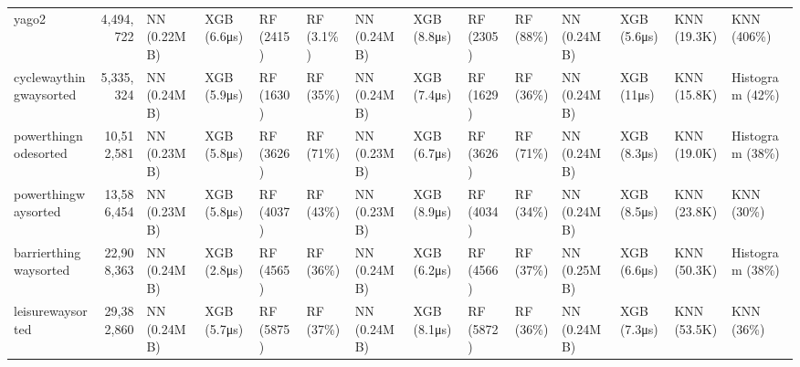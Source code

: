 \documentclass{article}
\begin{document}
\begin{table}
{\begin{tabular}{l|r|l|l|l|l|l|l|l|l|l|l|l|l}
yago2 & 4,494,722 & NN (0.22MB) & XGB (6.6μs) & RF (2415) & RF (3.1\%) & NN (0.24MB) & XGB (8.8μs) & RF (2305) & RF (88\%) & NN (0.24MB) & XGB (5.6μs) & KNN (19.3K) & KNN (406\%) \\
cyclewaythingwaysorted & 5,335,324 & NN (0.24MB) & XGB (5.9μs) & RF (1630) & RF (35\%) & NN (0.24MB) & XGB (7.4μs) & RF (1629) & RF (36\%) & NN (0.24MB) & XGB (11μs) & KNN (15.8K) & Histogram (42\%) \\
powerthingnodesorted & 10,512,581 & NN (0.23MB) & XGB (5.8μs) & RF (3626) & RF (71\%) & NN (0.23MB) & XGB (6.7μs) & RF (3626) & RF (71\%) & NN (0.24MB) & XGB (8.3μs) & KNN (19.0K) & Histogram (38\%) \\
powerthingwaysorted & 13,586,454 & NN (0.23MB) & XGB (5.8μs) & RF (4037) & RF (43\%) & NN (0.23MB) & XGB (8.9μs) & RF (4034) & RF (34\%) & NN (0.24MB) & XGB (8.5μs) & KNN (23.8K) & KNN (30\%) \\
barrierthingwaysorted & 22,908,363 & NN (0.24MB) & XGB (2.8μs) & RF (4565) & RF (36\%) & NN (0.24MB) & XGB (6.2μs) & RF (4566) & RF (37\%) & NN (0.25MB) & XGB (6.6μs) & KNN (50.3K) & Histogram (38\%) \\
leisurewaysorted & 29,382,860 & NN (0.24MB) & XGB (5.7μs) & RF (5875) & RF (37\%) & NN (0.24MB) & XGB (8.1μs) & RF (5872) & RF (36\%) & NN (0.24MB) & XGB (7.3μs) & KNN (53.5K) & KNN (36\%) \\
\bottomrule
\end{tabular}}
\end{table}
\end{document}
